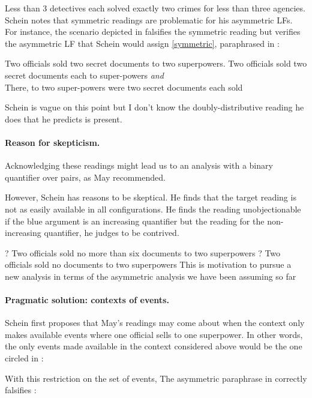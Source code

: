 \documentclass[english]{article}
\newcommand{\fg}{\color{darkred}}
\newcommand{\bg}{\color{blueish}}
\begin{document}
\ex
{\fg Less than 3 detectives} each solved {\bg exactly two crimes} for {\fg less than three agencies}.
\xe
%
Schein notes that symmetric readings are problematic for his asymmetric LFs. For instance, the scenario depicted in \cnextxc falsifies the symmetric reading but verifies the asymmetric LF that Schein would assign \cref{symmetric}, paraphrased in \cnextxb:

\pex
\a 
{\fg Two officials} sold {\bg two secret documents} to {\fg two superpowers}.\label{symmetric}
\a
Two officials sold two secret documents each to super-powers \emph{and}\\
There, to two super-powers were two secret documents each sold
\a 

\xe
%
Schein is vague on this point but I don't know the doubly-distributive reading he does that he predicts is present.

\paragraph{Reason for skepticism.} 
Acknowledging these readings might lead us to an analysis with a binary quantifier over pairs, as May recommended.

However, Schein has reasons to be skeptical. He finds that the target reading is not as easily available in all configurations.
He finds the reading unobjectionable if the {\bg blue} argument is an increasing quantifier but the reading for the non-increasing quantifier, he judges to be contrived.

\pex
\a 
\ljudge? {\fg Two officials} sold {\bg no more than six documents} to {\fg two superpowers}
\a 
\ljudge? {\fg Two officials} sold {\bg no documents} to {\fg two superpowers}
\xe
%
This is motivation to pursue a new analysis in terms of the asymmetric analysis we have been assuming so far

\paragraph{Pragmatic solution: contexts of events.} Schein first proposes that May's readings may come about when the context only makes available events where one official sells to one superpower. In other words, the only events made available in the context considered above would be the one circled in \cnextx:

\ex

\xe
%
With this restriction on the set of events, 
The asymmetric paraphrase in \cnextxb correctly falsifies \cnextxa:
\end{document}
